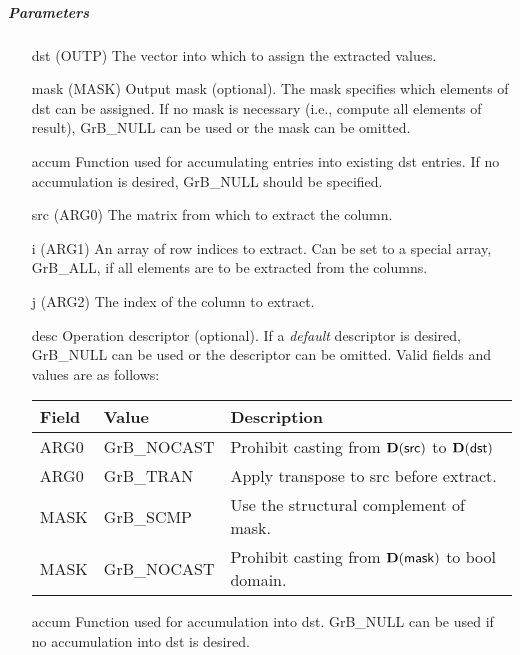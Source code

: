 \subparagraph{Parameters}

\begin{itemize}[leftmargin=1in]
    \item[{\sf dst}]   ({\sf OUTP}) The vector into which to assign the extracted values.
    \item[{\sf mask}]  ({\sf MASK}) Output mask (optional). The mask
    specifies which elements of {\sf dst} can be assigned.
    If no mask is necessary (i.e., compute all elements of result),
    {\sf GrB\_NULL} can be used or the mask can be omitted.
    \item[{\sf accum}]  Function used for accumulating entries into existing {\sf dst} entries. 
			If no accumulation is desired, {\sf GrB\_NULL} should be specified.
    \item[{\sf src}]   ({\sf ARG0}) The matrix from which to extract the column.

    \item[{\sf i}]     ({\sf ARG1}) An array of row indices to extract. Can
                              be set to a special array, {\sf GrB\_ALL}, if all elements
                              are to be extracted from the columns.
    \item[{\sf j}]     ({\sf ARG2}) The index of the column to extract.

    \item[{\sf desc}]   Operation descriptor (optional). If a
    \emph{default} descriptor is desired, {\sf GrB\_NULL} can be
    used or the descriptor can be omitted.  Valid fields and values are as follows: \\
    \begin{tabular}{lll}
    Field  & Value & Description \\
    \hline
    {\sf ARG0} & {\sf GrB\_NOCAST} & Prohibit casting from $\bold{D}({\sf src})$ to $\bold{D}({\sf dst})$ \\
    {\sf ARG0} & {\sf GrB\_TRAN} & Apply transpose to {\sf src} before extract. \\
    {\sf MASK} & {\sf GrB\_SCMP} & Use the structural complement of {\sf mask}. \\
    {\sf MASK} & {\sf GrB\_NOCAST} & Prohibit casting from $\bold{D}({\sf mask})$ to {\sf bool} domain. \\
    \end{tabular}

    \item[{\sf accum}] Function used for accumulation into dst.  {\sf GrB\_NULL}
                       can be used if no accumulation into dst is desired.
\end{itemize}

